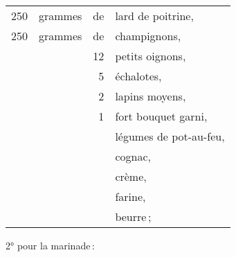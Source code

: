 \footnotesize
\begin{longtable}{rrrp{16em}}
    250 & grammes & de & lard de poitrine,                                                                \\
    250 & grammes & de & champignons,                                                                     \\
        &         & 12 & petits oignons,                                                                  \\
        &         &  5 & échalotes,                                                                       \\
        &         &  2 & lapins moyens,                                                                   \\
        &         &  1 & fort bouquet garni,                                                              \\
        &         &    & légumes de pot-au-feu,                                                           \\
        &         &    & cognac,                                                                          \\
        &         &    & crème,                                                                           \\
        &         &    & farine,                                                                          \\
        &         &    & beurre ;                                                                         \\
\end{longtable}
\normalsize

2° pour la marinade :

